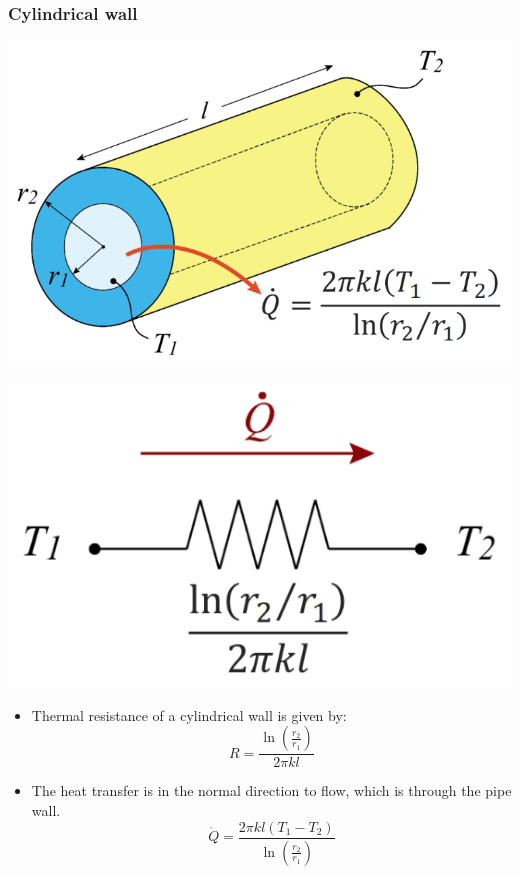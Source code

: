 \documentclass[11pt]{article}
\begin{document}
\subsubsection{Cylindrical wall}
\label{sec:org1e5b133}
\begin{center}
\includegraphics[scale=1]{./images/thermal-resistance-cylindrical-wall.png}
\end{center}
\begin{center}
\includegraphics[scale=1]{./images/thermal-resistance-cylindrical-wall-electrical-analogy.png}
\end{center}
\begin{itemize}
\item Thermal resistance of a cylindrical wall is given by:
\[R = \frac{\ln \left(\frac{r_2}{r_1} \right)}{2 \pi k l}\]
\item The heat transfer is in the normal direction to flow, which is through the pipe wall.
\[\dot{Q} = \frac{2 \pi kl (T_1 - T_2)}{\ln \left(\frac{r_2}{r_1} \right)}\]
\end{itemize}
\end{document}
